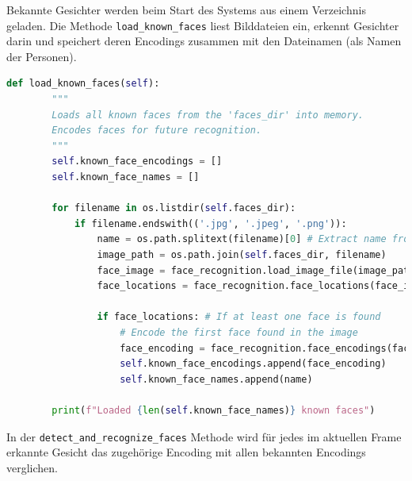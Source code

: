 Bekannte Gesichter werden beim Start des Systems aus einem Verzeichnis geladen. Die Methode \texttt{load\_known\_faces} liest Bilddateien ein, erkennt Gesichter darin und speichert deren Encodings zusammen mit den Dateinamen (als Namen der Personen).

\begin{lstlisting}[language=Python, caption={Laden bekannter Gesichter}, label={lst:yolo_load}, inputencoding=utf8]
    def load_known_faces(self):
        """
        Loads all known faces from the 'faces_dir' into memory.
        Encodes faces for future recognition.
        """
        self.known_face_encodings = []
        self.known_face_names = []

        for filename in os.listdir(self.faces_dir):
            if filename.endswith(('.jpg', '.jpeg', '.png')):
                name = os.path.splitext(filename)[0] # Extract name from filename
                image_path = os.path.join(self.faces_dir, filename)
                face_image = face_recognition.load_image_file(image_path)
                face_locations = face_recognition.face_locations(face_image) # Find faces in the loaded image

                if face_locations: # If at least one face is found
                    # Encode the first face found in the image
                    face_encoding = face_recognition.face_encodings(face_image, face_locations)[0]
                    self.known_face_encodings.append(face_encoding)
                    self.known_face_names.append(name)

        print(f"Loaded {len(self.known_face_names)} known faces")
\end{lstlisting}

In der \texttt{detect\_and\_recognize\_faces} Methode wird für jedes im aktuellen Frame erkannte Gesicht das zugehörige Encoding mit allen bekannten Encodings verglichen.

